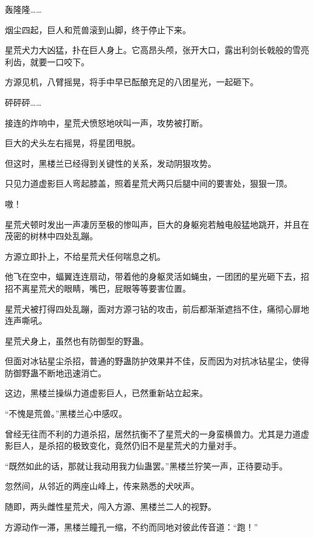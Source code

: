 \begin{this_body}
轰隆隆……

烟尘四起，巨人和荒兽滚到山脚，终于停止下来。

星荒犬力大凶猛，扑在巨人身上。它高昂头颅，张开大口，露出利剑长戟般的雪亮利齿，就要一口咬下。

方源见机，八臂摇晃，将手中早已酝酿充足的八团星光，一起砸下。

砰砰砰……

接连的炸响中，星荒犬愤怒地吠叫一声，攻势被打断。

巨大的犬头左右摇晃，将星团甩脱。

但这时，黑楼兰已经得到关键性的关系，发动阴狠攻势。

只见力道虚影巨人弯起膝盖，照着星荒犬两只后腿中间的要害处，狠狠一顶。

嗷！

星荒犬顿时发出一声凄厉至极的惨叫声，巨大的身躯宛若触电般猛地跳开，并且在茂密的树林中四处乱蹦。

方源立即扑上，不给星荒犬任何喘息之机。

他飞在空中，蝠翼连连扇动，带着他的身躯灵活如蝇虫，一团团的星光砸下去，招招不离星荒犬的眼睛，嘴巴，屁眼等等要害位置。

星荒犬被打得四处乱蹦，面对方源刁钻的攻击，前后都渐渐遮挡不住，痛彻心扉地连声嘶吼。

星荒犬身上，虽然也有防御型的野蛊。

但面对冰钻星尘杀招，普通的野蛊防护效果并不佳，反而因为对抗冰钻星尘，使得防御野蛊不断地迅速消亡。

这边，黑楼兰操纵力道虚影巨人，已然重新站立起来。

“不愧是荒兽。”黑楼兰心中感叹。

曾经无往而不利的力道杀招，居然抗衡不了星荒犬的一身蛮横兽力。尤其是力道虚影巨人，是杀招的极致变化，竟然仍旧不是星荒犬的力量对手。

“既然如此的话，那就让我动用我力仙蛊罢。”黑楼兰狞笑一声，正待要动手。

忽然间，从邻近的两座山峰上，传来熟悉的犬吠声。

随即，两头雌性星荒犬，闯入方源、黑楼兰二人的视野。

方源动作一滞，黑楼兰瞳孔一缩，不约而同地对彼此传音道：“跑！”

\end{this_body}


